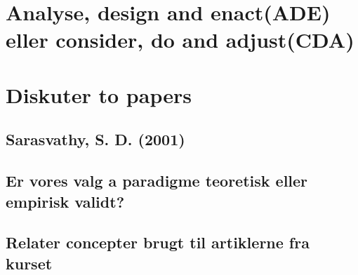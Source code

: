 \documentclass[a4paper]{article}
\begin{document}









\section{Analyse, design and enact(ADE) eller consider, do and adjust(CDA)}
\label{paradigme}


\section{Diskuter to papers}

\subsection{Sarasvathy, S. D. (2001)}


\subsection{Er vores valg a paradigme teoretisk eller empirisk validt?}
\subsection{Relater concepter brugt til artiklerne fra kurset}

\printbibliography[heading=bibintoc]
\end{document}
